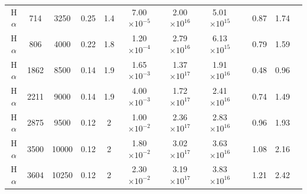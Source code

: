 \documentclass[useAMS,usenatbib,usegraphicx]{mnras}
\begin{document}
\begin{table}
\begin{minipage}{180mm}
\begin{center}
\begin{tabular}{@{} cccccccccccc @{}}
H$\alpha$ & 714 & 3250 & 0.25 & 1.4 & 7.00$\times 10^{-5}$ &   2.00$\times 10^{16}$ & 5.01$\times 10^{15}$ & & 0.87 & 1.74 \\
H$\alpha$ & 806 & 4000 & 0.22 & 1.8 & 1.20$\times 10^{-4}$ &   2.79$\times 10^{16}$ & 6.13$\times 10^{15}$ & & 0.79 & 1.59\\
H$\alpha$ & 1862 & 8500 & 0.14 & 1.9 & 1.65$\times 10^{-3}$ &   1.37$\times 10^{17}$ & 1.91$\times 10^{16}$ & & 0.48 & 0.96 \\

H$\alpha$ & 2211 & 9000 & 0.14 & 1.9 & 4.00$\times 10^{-3}$ &   1.72$\times 10^{17}$ & 2.41$\times 10^{16}$ & & 0.74 & 1.49\\

H$\alpha$ & 2875 & 9500 & 0.12 & 2 & 1.00$\times 10^{-2}$ &   2.36$\times 10^{17}$ & 2.83$\times 10^{16}$ & & 0.96 & 1.93 \\

H$\alpha$ & 3500 & 10000 & 0.12 & 2 & 1.80$\times 10^{-2}$  & 3.02$\times 10^{17}$ & 3.63$\times 10^{16}$ && 1.08 & 2.16  \\

H$\alpha$ & 3604 & 10250 & 0.12 & 2 & 2.30$\times 10^{-2}$ &   3.19$\times 10^{17}$ & 3.83$\times 10^{16}$ & & 1.21 & 2.42 \\ 

    \hline
  \end{tabular}
  \end{center}
\end{minipage}
\end{table}
\end{document}
